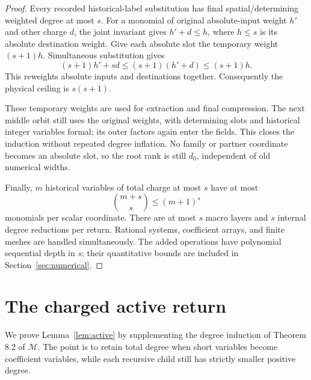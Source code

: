 \documentclass[11pt,a4paper]{article}
\theoremstyle{definition}
\newcommand{\M}{\mathcal M}
\begin{document}
\begin{proof}
Every recorded historical-label substitution has final
spatial/determining weighted degree at most \(s\). For a monomial
of original absolute-input weight \(h'\) and other charge \(d\),
the joint invariant gives \(h'+d\le h\), where \(h\le s\) is
its absolute destination weight. Give each absolute slot the
temporary weight \((s+1)h\). Simultaneous substitution gives
\begin{equation}\label{eq:quadratic}
 (s+1)h'+sd\le (s+1)(h'+d)\le(s+1)h.
\end{equation}
This reweights absolute inputs and destinations together.
Consequently the physical ceiling is \(s(s+1)\).

These temporary weights are used for extraction and final
compression. The next middle orbit still uses the original
weights, with determining slots and historical integer variables
formal; its outer factors again enter the fields. This closes
the induction without repeated degree inflation. No family or
partner coordinate becomes an absolute slot, so the root rank
is still \(d_0\), independent of old numerical widths.

Finally, \(m\) historical variables of total charge at most \(s\)
have at most
\[
 \binom{m+s}{s}\le(m+1)^s
\]
monomials per scalar coordinate. There are at most \(s\) macro
layers and \(s\) internal degree reductions per return.
Rational systems, coefficient arrays, and finite meshes are
handled simultaneously. The added operations have polynomial
sequential depth in \(s\); their quantitative bounds are included
in Section~\ref{sec:numerical}.
\end{proof}

\section{The charged active return}\label{sec:active}

We prove Lemma~\ref{lem:active} by supplementing the degree induction
of Theorem 8.2 of \(\M\). The point is to retain total degree when
short variables become coefficient variables, while each recursive
child still has strictly smaller positive degree.
\end{document}

